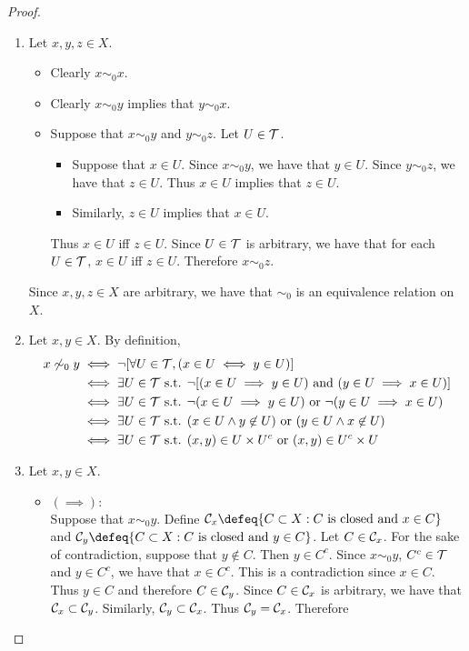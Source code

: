 \documentclass{book}
\begin{document}
	\begin{proof}\
		\begin{enumerate}
			\item Let $x,y,z \in X$.
			\begin{itemize}
				\item Clearly $x \sim_0 x$. 
				\item Clearly $x \sim_0 y$ implies that $y \sim_0 x$. 
				\item Suppose that $x \sim_0 y$ and $y \sim_0 z$. Let $U \in \mathcal{T}$. 
				\begin{itemize}
					\item Suppose that $x \in U$. Since $x \sim_0 y$, we have that $y \in U$. Since $y \sim_0 z$, we have that $z \in U$. Thus $x \in U$ implies that $z \in U$.
					\item Similarly, $z \in U$ implies that $x \in U$. 
				\end{itemize}
				Thus $x \in U$ iff $z \in U$. Since $U \in \mathcal{T}$ is arbitrary, we have that for each $U \in \mathcal{T}$, $x \in U$ iff $z \in U$. Therefore $x \sim_0 z$.
			\end{itemize}
			Since $x,y,z \in X$ are arbitrary, we have that $\sim_0$ is an equivalence relation on $X$.
			\item Let $x, y \in X$. By definition, 
			\begin{align*}
				x \not \sim_0 y
				& \iff \neg [\forall U \in \mathcal{T}, (x \in U \iff y \in U)] \\
				& \iff \exists U \in \mathcal{T} \text{ s.t. } \neg [(x \in U \implies y \in U) \text{ and } (y \in U \implies x \in U)] \\
				& \iff \exists U \in \mathcal{T} \text{ s.t. } \neg (x \in U \implies y \in U) \text{ or } \neg (y \in U \implies x \in U) \\
				& \iff \exists U \in \mathcal{T} \text{ s.t. } (x \in U \wedge y \not \in U) \text{ or } (y \in U \wedge x \not \in U) \\
				& \iff \exists U \in \mathcal{T} \text{ s.t. } (x,y) \in U \times U^c \text{ or } (x,y) \in U^c \times U
			\end{align*}
			\item Let $x,y \in X$. 
			\begin{itemize}
				\item $(\implies):$ \\
				Suppose that $x \sim_0 y$. Define $\MC_x \defeq \{C \subset X: \text{$C$ is closed and $x \in C$}\}$ and $\MC_y \defeq \{C \subset X: \text{$C$ is closed and $y \in C$}\}$. Let $C \in \mathcal{C}_x$. For the sake of contradiction, suppose that $y \not \in C$. Then $y \in C^c$. Since $x \sim_0 y$, $C^c \in \mathcal{T}$ and $y \in C^c$, we have that $x \in C^c$. This is a contradiction since $x \in C$. Thus $y \in C$ and therefore $C \in \mathcal{C}_y$. Since $C \in \mathcal{C}_x$ is arbitrary, we have that $\mathcal{C}_x \subset \mathcal{C}_y$. Similarly, $\mathcal{C}_y \subset \mathcal{C}_x$. Thus $\mathcal{C}_y = \mathcal{C}_x$. Therefore 

\end{itemize}
\end{enumerate}
\end{proof}
\end{document}
